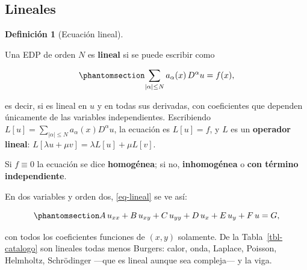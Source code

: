 \documentclass[
  spanish,
  a4paper,
]{scrbook}
\theoremstyle{definition}
\newtheorem{definition}{Definición}[chapter]
\theoremstyle{plain}
\theoremstyle{definition}
\theoremstyle{plain}
\theoremstyle{definition}
\theoremstyle{remark}
\begin{document}
\subsection{Lineales}\label{sec-lineales}

\begin{definition}[Ecuación
lineal]\protect\hypertarget{def-lineal}{}\label{def-lineal}

Una EDP de orden \(N\) es \textbf{lineal} si se puede escribir como

\begin{equation}\protect\phantomsection\label{eq-lineal}{
\sum_{|\alpha| \le N} a_\alpha(x)\, D^\alpha u = f(x),
}\end{equation}

es decir, si es lineal en \(u\) y en todas sus derivadas, con
coeficientes que dependen únicamente de las variables independientes.
Escribiendo \(L[u] = \sum_{|\alpha|\le N} a_\alpha(x)D^\alpha u\), la
ecuación es \(L[u] = f\), y \(L\) es un \textbf{operador lineal}:
\(L[\lambda u + \mu v] = \lambda L[u] + \mu L[v]\).

Si \(f \equiv 0\) la ecuación se dice \textbf{homogénea}; si no,
\textbf{inhomogénea} o \textbf{con término independiente}.

\end{definition}

En dos variables y orden dos, \ref{eq-lineal} se ve así:

\begin{equation}\protect\phantomsection\label{eq-lineal-2var}{
A\,u_{xx} + B\,u_{xy} + C\,u_{yy} + D\,u_x + E\,u_y + F\,u = G,
}\end{equation}

con todos los coeficientes funciones de \((x,y)\) solamente. De la
Tabla~\ref{tbl-catalogo} son lineales todas menos Burgers: calor, onda,
Laplace, Poisson, Helmholtz, Schrödinger ---que es lineal aunque sea
compleja--- y la viga.
\end{document}
